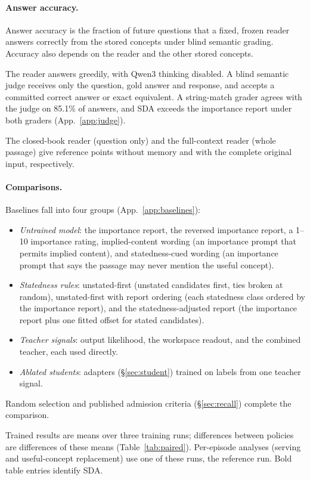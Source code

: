 \paragraph{Answer accuracy.}
Answer accuracy is the fraction of future questions that a fixed,
frozen reader answers correctly from the stored concepts under blind
semantic grading. Accuracy also depends on the reader and the other
stored concepts.

The reader answers greedily, with Qwen3 thinking disabled. A blind
semantic judge receives only the question, gold answer and response,
and accepts a committed correct answer or exact equivalent. A
string-match grader agrees with the judge on 85.1\% of answers, and
SDA exceeds the importance report under both graders
(App.~\ref{app:judge}).

The closed-book reader (question only) and the full-context reader
(whole passage) give reference points without memory and with the
complete original input, respectively.

\paragraph{Comparisons.}
Baselines fall into four groups (App.~\ref{app:baselines}):
\begin{itemize}
\item \emph{Untrained model}: the importance report, the reversed
importance report, a 1--10 importance rating, implied-content wording
(an importance prompt that permits implied content), and
statedness-cued wording (an importance prompt that says the passage
may never mention the useful concept).
\item \emph{Statedness rules}: unstated-first (unstated candidates
first, ties broken at random), unstated-first with report ordering
(each statedness class ordered by the importance report), and the
statedness-adjusted report (the importance report plus one fitted
offset for stated candidates).
\item \emph{Teacher signals}: output likelihood, the workspace
readout, and the combined teacher, each used directly.
\item \emph{Ablated students}: adapters (\S\ref{sec:student}) trained
on labels from one teacher signal.
\end{itemize}
Random selection and published admission criteria (\S\ref{sec:recall})
complete the comparison.

Trained results are means over three training runs; differences between
policies are differences of these means
(Table~\ref{tab:paired}). Per-episode analyses (serving and
useful-concept replacement) use one of these runs, the reference run.
Bold table entries identify SDA.


